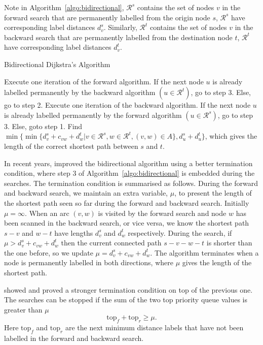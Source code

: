 Note in Algorithm~\ref{algo:bidirectional},
$\mathcal{R}^s$ contains the set of nodes $v$ in the forward search that are permanently labelled from the origin node $s$,
$\mathcal{R}^s$ have corresponding label distances $d_v^s$.
Similarly, $\mathcal{R}^t$ contains the set of nodes $v$ in the backward search that are permanently labelled from the destination node $t$,
$\mathcal{R}^t$ have corresponding label distances $d_v^t$.

\begin{algorithm}[!ht]
    \caption{Bidirectional Dijkstra's Algorithm}
    \label{algo:bidirectional}
    \begin{algorithmic}[1]
        \State Execute one iteration of the forward algorithm.
        If the next node $u$ is already labelled permanently by the 
        backward algorithm $(u\in\mathcal{R}^t)$, go to step 3.
        Else, go to step 2.
        \State Execute one iteration of the backward algorithm.
        If the next node $u$ is already labelled permanently by the
        forward algorithm $(u\in\mathcal{R}^s)$, go to step 3.
        Else, goto step 1.
        \State Find $\min\{\min\{d_v^s + c_{vw} + d_w^t | v \in \mathcal{R}^s, w \in \mathcal{R}^t, (v, w) \in A\}, d_u^s + d_u^t\}$, which gives the length of the correct shortest path between $s$ and $t$.
    \EndProcedure
\end{algorithmic}
\end{algorithm}

In recent years,
\citet{Goldberg05} improved the bidirectional algorithm using a better termination condition,
where step 3 of Algorithm~\ref{algo:bidirectional} is embedded during the searches.
The termination condition is summarised as follows.
During the forward and backward search,
we maintain an extra variable, $\mu$, to present the length of the shortest path seen so far during the forward and backward search.
Initially $\mu = \infty$.
When an arc $(v,w)$ is visited by the forward search and node $w$ has been scanned in the backward search, or vice versa,
we know the shortest path $s-v$ and $w-t$ have lengths $d_v^s$ and $d_w^t$ respectively.
During the search, if $\mu > d_v^s + c_{vw} + d_w^t$ then the current connected path $s-v-w-t$ is shorter than the one before, 
so we update $\mu = d_v^s + c_{vw} + d_w^t$.
The algorithm terminates when a node is permanently labelled in both directions,
where $\mu$ gives the length of the shortest path.

\citet{GoldbergEPP} showed and proved a stronger termination condition on top of the previous one.
The searches can be stopped if the sum of the two top priority queue values is greater than $\mu$
\[
    \text{top}_f + \text{top}_r \geq \mu.
\]
Here $\text{top}_f$ and $\text{top}_r$ are the next minimum distance labels that have not been labelled in the forward and backward search.

